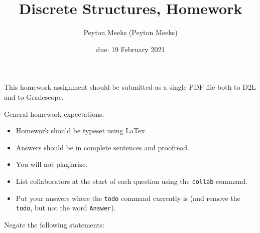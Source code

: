 \documentclass{article}
\title{Discrete Structures, Homework \hwnum}
\author{Peyton Meeks (Peyton Meeks)}
\date{due: 19 February 2021}
\begin{document}
\maketitle

This homework assignment should be
submitted as a single PDF file both to D2L and to Gradescope.

General homework expectations:
\begin{itemize}
    \item Homework should be typeset using LaTex.
    \item Answers should be in complete sentences and proofread.
    \item You will not plagiarize.  \item List collaborators at the start of each question using the \texttt{collab} command.
    \item Put your answers where the \texttt{todo} command currently is (and
        remove the \texttt{todo}, but not the word \texttt{Answer}).
\end{itemize}

 
Negate the following statements:
\end{document}
